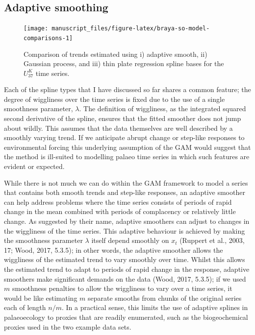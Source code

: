 \documentclass[12pt,]{article}
\newcommand{\uk}{\ensuremath{\mathit{U}^{\mathit{K}}_{\mathup{37}}}}
\begin{document}
\subsection{Adaptive smoothing}\label{adaptive-smoothing}

\begin{figure}

{\centering \texttt{[image: manuscript\_files/figure-latex/braya-so-model-comparisons-1]} 

}

\caption{Comparison of trends estimated using i) adaptive smooth, ii) Gaussian process, and iii) thin plate regression spline bases for the \uk{} time series.}\label{fig:braya-so-model-comparisons}
\end{figure}

Each of the spline types that I have discussed so far shares a common
feature; the degree of wiggliness over the time series is fixed due to
the use of a single smoothness parameter, \(\lambda\). The definition of
wiggliness, as the integrated squared second derivative of the spline,
ensures that the fitted smoother does not jump about wildly. This
assumes that the data themselves are well described by a smoothly
varying trend. If we anticipate abrupt change or step-like responses to
environmental forcing this underlying assumption of the GAM would
suggest that the method is ill-suited to modelling palaeo time series in
which such features are evident or expected.

While there is not much we can do within the GAM framework to model a
series that contains both smooth trends and step-like responses, an
adaptive smoother can help address problems where the time series
consists of periods of rapid change in the mean combined with periods of
complacency or relatively little change. As suggested by their name,
adaptive smoothers can adjust to changes in the wiggliness of the time
series. This adaptive behaviour is achieved by making the smoothness
parameter \(\lambda\) itself depend smoothly on \(x_t\) (Ruppert et al.,
2003, 17; Wood, 2017, 5.3.5); in other words, the adaptive smoother
allows the wiggliness of the estimated trend to vary smoothly over time.
Whilst this allows the estimated trend to adapt to periods of rapid
change in the response, adaptive smoothers make significant demands on
the data (Wood, 2017, 5.3.5); if we used \(m\) smoothness penalties to
allow the wiggliness to vary over a time series, it would be like
estimating \(m\) separate smooths from chunks of the original series
each of length \(n/m\). In a practical sense, this limits the use of
adaptive splines in palaeoecology to proxies that are readily
enumerated, such as the biogeochemical proxies used in the two example
data sets.
\end{document}
